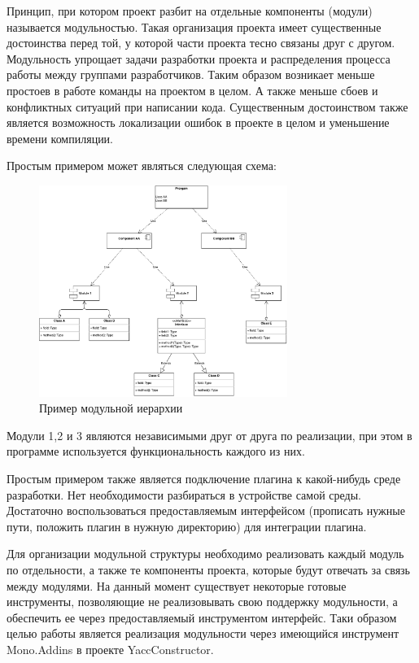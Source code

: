 \documentclass{matmex-diploma}
\begin{document}
Принцип, при котором проект разбит на отдельные компоненты (модули) называется модульностью. Такая организация проекта имеет существенные достоинства перед той, у которой части проекта тесно связаны друг с другом. Модульность упрощает задачи разработки проекта и распределения процесса работы между группами разработчиков. Таким образом возникает меньше простоев в работе команды на проектом в целом. А также меньше сбоев и конфликтных ситуаций при написании кода. Существенным достоинством также является возможность локализации ошибок в проекте в целом и уменьшение времени компиляции.

Простым примером может являться следующая схема:

\begin{figure}[h!]
\begin{center}
\includegraphics[width=0.72\textwidth]{module_example}
\caption{Пример модульной иерархии}
\label{fig:module_example} 
\end{center}
\end{figure}

Модули 1,2 и 3 являются независимыми друг от друга по реализации, при этом в программе используется функциональность каждого из них.

Простым примером также является подключение плагина к какой-нибудь среде разработки. Нет необходимости разбираться в устройстве самой среды. Достаточно воспользоваться предоставляемым интерфейсом (прописать нужные пути, положить плагин в нужную директорию) для интеграции плагина.

Для организации модульной структуры необходимо реализовать каждый модуль по отдельности, а также те компоненты проекта, которые будут отвечать за связь между модулями. На данный момент существует некоторые готовые инструменты, позволяющие не реализовывать свою поддержку модульности, а обеспечить ее через предоставляемый инструментом интерфейс.
Таки образом целью работы является реализация модульности через имеющийся инструмент Mono.Addins в проекте YaccConstructor.
\end{document}
